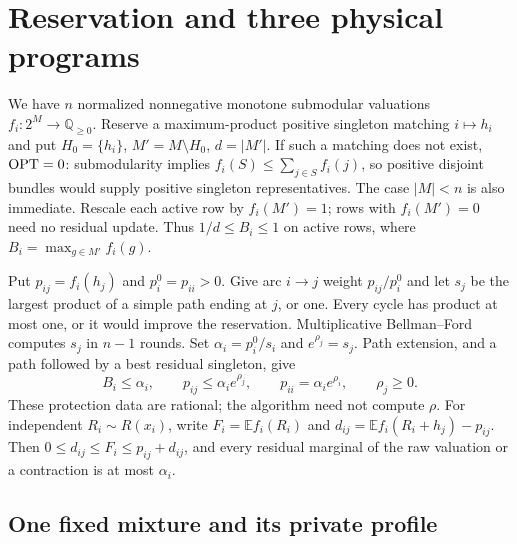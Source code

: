 \section{Reservation and three physical programs}\label{simp:score-primitives}

We have $n$ normalized nonnegative monotone submodular valuations
$f_i:2^M\to\mathbb Q_{\ge0}$. Reserve a maximum-product positive singleton
matching $i\mapsto h_i$ and put $H_0=\{h_i\}$, $M'=M\setminus H_0$,
$d=|M'|$. If such a matching does not exist, $\operatorname{OPT}=0$: submodularity
implies $f_i(S)\le\sum_{j\in S}f_i(j)$, so positive disjoint bundles
would supply positive singleton representatives. The case $|M|<n$ is
also immediate. Rescale each active row by $f_i(M')=1$; rows with
$f_i(M')=0$ need no residual update. Thus $1/d\le B_i\le1$ on active
rows, where $B_i=\max_{g\in M'}f_i(g)$.

Put $p_{ij}=f_i(h_j)$ and $p_i^0=p_{ii}>0$. Give arc $i\to j$ weight
$p_{ij}/p_i^0$ and let $s_j$ be the largest product of a simple path
ending at $j$, or one. Every cycle has product at most one, or it would
improve the reservation. Multiplicative Bellman--Ford computes $s_j$
in $n-1$ rounds. Set $\alpha_i=p_i^0/s_i$ and $e^{\rho_j}=s_j$.
Path extension, and a path followed by a best residual singleton, give
\begin{equation}\label{na:reservation-dual}
 B_i\le\alpha_i,\qquad p_{ij}\le\alpha_i e^{\rho_j},\qquad
 p_{ii}=\alpha_i e^{\rho_i},\qquad\rho_j\ge0.
\end{equation}
These protection data are rational; the algorithm need not compute $\rho$.
For independent $R_i\sim R(x_i)$, write
$F_i=\mathbb Ef_i(R_i)$ and $d_{ij}=\mathbb Ef_i(R_i+h_j)-p_{ij}$.
Then $0\le d_{ij}\le F_i\le p_{ij}+d_{ij}$, and every residual
marginal of the raw valuation or a contraction is at most $\alpha_i$.

\subsection{One fixed mixture and its private profile}


